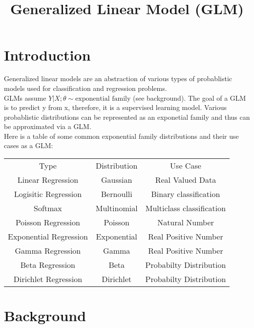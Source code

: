 \documentclass{article}
\title{Generalized Linear Model (GLM)}
\begin{document}
\maketitle

\section{Introduction}

Generalized linear models are an abstraction of various types of probablistic models used for classification and regression problems. \\
GLMs assume $Y|X;\theta \sim \text{exponential family}$ (see background). The goal of a GLM is to predict y from x, therefore, it is a supervised learning model. 
Various probablistic distributions can be represented as an exponetial family and thus can be approximated via a GLM. \\
Here is a table of some common exponential family distributions and their use cases as a GLM:\\
\begin{center}
    \begin{tabular}{ c c c }
     Type & Distribution & Use Case \\ 
     Linear Regression & Gaussian & Real Valued Data \\  
     Logisitic Regression & Bernoulli & Binary classification\\
     Softmax & Multinomial & Multiclass classification\\
     Poisson Regression & Poisson & Natural Number\\
     Exponential Regression & Exponential & Real Positive Number\\
     Gamma Regression & Gamma & Real Positive Number\\
     Beta Regression & Beta & Probabilty Distribution\\
     Dirichlet Regression & Dirichlet & Probabilty Distribution\\
    \end{tabular}
\end{center}
\section{Background}
\end{document}
